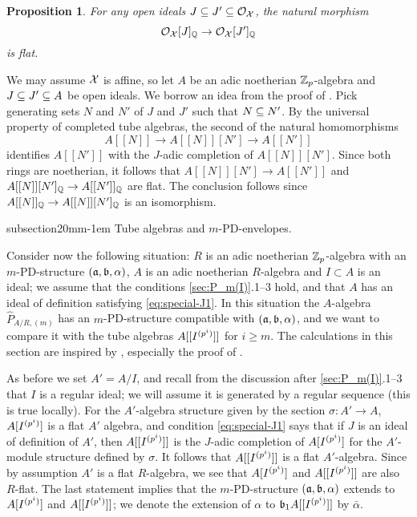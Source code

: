 \documentclass{article}
\makeatletter
\theoremstyle{change}
\newtheorem{prop}[subsubsection]{Proposition}
\renewcommand{\subsection}{\@startsection%
{subsection}{2}{0mm}{\baselineskip}{-1em}%
{\normalfont\normalsize\bfseries}}
\numberwithin{equation}{subsubsection}
\newcommand{\demobox}{\vrule height6pt width6pt depth0pt}
\newenvironment{demo}{\noindent{\it Proof.}}
{{\unskip\nobreak\hfil\qquad
\demobox\parfillskip=0pt\par}
\medskip}
\makeatother
\begin{document}
\begin{prop}\label{prop:O[J]-flatness}
  For any open ideals $J\subseteq J'\subseteq{\cal O}_{\cal X}$, the natural morphism
  \begin{displaymath}
    {\cal O}_{\cal X}[J]_{\mathbb Q}\to{\cal O}_{\cal X}[J']_{\mathbb Q}
  \end{displaymath}
  is flat.
\end{prop}
\begin{demo}
  We may assume ${\cal X}$ is affine, so let $A$ be an adic noetherian
  ${\mathbb Z}_p$-algebra and $J\subseteq J'\subseteq A$ be open ideals.  We borrow an
  idea from the proof of \cite[Th. 3.5.3]{berthelot:1996}. Pick
  generating sets $N$ and $N'$ of $J$ and $J'$ such that $N\subseteq N'$.
  By the universal property of completed tube algebras, the second of
  the natural homomorphisms
  \begin{displaymath}
    A[[N]]\to A[[N]][N']\to A[[N']]
  \end{displaymath}
  identifies $A[[N']]$ with the $J$-adic completion of
  $A[[N]][N']$. Since both rings are noetherian, it follows that
  $A[[N]][N']\to A[[N']]$ and $A[[N]][N']_{\mathbb Q}\to A[[N']]_{\mathbb Q}$ are
  flat. The conclusion follows since $A[[N]]_{\mathbb Q}\to A[[N]][N']_{\mathbb Q}$ is
  an isomorphism.
\end{demo}

\subsection{Tube algebras and $m$-PD-envelopes.}
\label{sec:PD-envelopes-tubes}

Consider now the following situation: $R$ is an adic noetherian
${\mathbb Z}_p$-algebra with an $m$-PD-structure $({\mathfrak a},{\mathfrak b},\alpha)$, $A$ is an
adic noetherian $R$-algebra and $I\subset A$ is an ideal; we assume
that the conditions \ref{sec:P_m(I)}.1--3 hold, and that $A$ has an
ideal of definition satisfying \ref{eq:special-J1}. In this situation
the $A$-algebra $\hat P_{A/R,(m)}$ has an $m$-PD-structure compatible
with $({\mathfrak a},{\mathfrak b},\alpha)$, and we want to compare it with the tube
algebras $A[[{I}^{({p^i})}]]$ for $i\ge m$. The calculations in this
section are inspired by \cite[\S3.1]{berthelot:1990}, especially the
proof of \cite[Prop. 3.1.2]{berthelot:1990}.

As before we set $A'=A/I$, and recall from the discussion after
\ref{sec:P_m(I)}.1--3 that $I$ is a regular ideal; we will assume it
is generated by a regular sequence (this is true locally). For the
$A'$-algebra structure given by the section $\sigma:A'\to A$,
$A[{I}^{({p^i})}]$ is a flat $A'$ algebra, and condition
\ref{eq:special-J1} says that if $J$ is an ideal of definition of
$A'$, then $A[[{I}^{({p^i})}]]$ is the $J$-adic completion of
$A[{I}^{({p^i})}]$ for the $A'$-module structure defined by
$\sigma$. It follows that $A[[{I}^{({p^i})}]]$ is a flat
$A'$-algebra. Since by assumption $A'$ is a flat $R$-algebra, we see
that $A[{I}^{({p^i})}]$ and $A[[{I}^{({p^i})}]]$ are also $R$-flat.  The
last statement implies that the $m$-PD-structure $({\mathfrak a},{\mathfrak b},\alpha)$
extends to $A[{I}^{({p^i})}]$ and $A[[{I}^{({p^i})}]]$; we denote the
extension of $\alpha$ to ${\mathfrak b}_1 A[[{I}^{({p^i})}]]$ by $\bar\alpha$.
\end{document}
